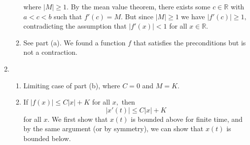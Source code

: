 \documentclass{article}
\numberwithin{equation}{section}
\begin{document}
\begin{enumerate}
\begin{enumerate}
        where $|M| \ge 1.$ By the mean value theorem, there exists some $c \in \mathbb{R}$ with $a<c<b$ such that $f'(c) = M.$ But since $|M|\ge 1$ we have $|f'(c)|\ge 1,$ contradicting the assumption that $|f'(x)|<1$ for all $x\in\mathbb{R}.$
        \item See part (a). We found a function $f$ that satisfies the preconditions but is not a contraction.
    \end{enumerate}
    \newpage
    \item \begin{enumerate}[label=(\alph*)]
        \item Limiting case of part (b), where $C=0$ and $M=K.$
        \item If $|f(x)| \le C|x|+K$ for all $x,$ then 
        \begin{equation}
            |x'(t)| \le C|x|+K 
        \end{equation} 
        for all $x.$ We first show that $x(t)$ is bounded above for finite time, and by the same argument (or by symmetry), we can show that $x(t)$ is bounded below.
        

\end{enumerate}
\end{enumerate}
\end{document}
